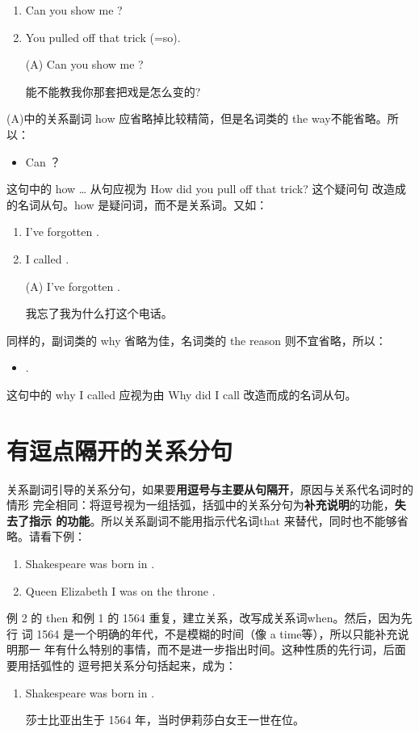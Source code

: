 \begin{enumerate}
\item Can you show me ?
\item You pulled off that trick  (=so).

  \reitem (A) Can you show me  ?

  能不能教我你那套把戏是怎么变的?
\end{enumerate}
(A)中的关系副词 how 应省略掉比较精简，但是名词类的 the way不能省略。所以：
\begin{itemize}
\item Can    ？
\end{itemize}
这句中的 how \ldots{} 从句应视为 How did you pull off that trick? 这个疑问句
改造成的名词从句。how 是疑问词，而不是关系词。又如：
\begin{enumerate}
\item I've forgotten .
\item I called .

  \reitem (A) I've forgotten   .

  我忘了我为什么打这个电话。
\end{enumerate}

同样的，副词类的 why 省略为佳，名词类的 the reason 则不宜省略，所以：
\begin{itemize}
\item {} .
\end{itemize}
这句中的 why I called 应视为由 Why did I call 改造而成的名词从句。

\section{有逗点隔开的关系分句}

关系副词引导的关系分句，如果要\textbf{用逗号与主要从句隔开}，原因与关系代名词时的情形
完全相同：将逗号视为一组括弧，括弧中的关系分句为\textbf{补充说明}的功能，\textbf{失去了指示
的功能}。所以关系副词不能用指示代名词that 来替代，同时也不能够省略。请看下例：

\begin{enumerate}
\item Shakespeare was born in .
\item Queen Elizabeth I was on the throne  .
\end{enumerate}
例 2 的 then 和例 1 的 1564 重复，建立关系，改写成关系词when。然后，因为先行
词 1564 是一个明确的年代，不是模糊的时间（像 a time等），所以只能补充说明那一
年有什么特别的事情，而不是进一步指出时间。这种性质的先行词，后面要用括弧性的
逗号把关系分句括起来，成为：
\begin{enumerate}[resume]
\item Shakespeare was born in  .

  莎士比亚出生于 1564 年，当时伊莉莎白女王一世在位。
\end{enumerate}


